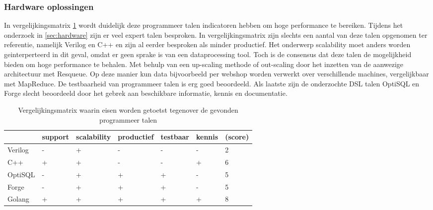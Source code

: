 \clearpage

\subsubsection{\textbf{Hardware oplossingen}}

In vergelijkingsmatrix \ref{tab:matrix_hardware} wordt duidelijk deze programmeer talen indicatoren hebben om hoge performance te bereiken. Tijdens het onderzoek in \ref{sec:hardware} zijn er veel expert talen besproken. In vergelijkingsmatrix zijn slechts een aantal van deze talen opgenomen ter referentie, namelijk Verilog en C++ en zijn al eerder besproken als minder productief. Het onderwerp scalability moet anders worden geinterperteerd in dit geval, omdat er geen sprake is van een dataprocessing tool. Toch is de consensus dat deze talen de mogelijkheid bieden om hoge performance te behalen. Met behulp van een up-scaling methode of out-scaling door het inzetten van de aanwezige architectuur met Resqueue. Op deze manier kun data bijvoorbeeld per webshop worden verwerkt over verschillende machines, vergelijkbaar met MapReduce. De testbaarheid van programmeer talen is erg goed beoordeeld. Als laatste zijn de onderzochte DSL talen OptiSQL en Forge slecht beoordeeld door het gebrek aan beschikbare informatie, kennis en documentatie.

\begin{table}[bh]
\caption{Vergelijkingsmatrix waarin eisen worden getoetst tegenover de gevonden programmeer talen}
\label{tab:matrix_hardware}
\begin{tabular}{|p{3cm}|l|l|l|l|l|l|}
\hline
           & support & scalability               & productief & testbaar & kennis &     (score)  \\ \hline
Verilog    & -       & +                         & -          & -        & -      & 2     \\ \hline
C++        & +       & +                         & -          & -        & +      & 6     \\ \hline
OptiSQL    & -       & +                         & +          & +        & -      & 5     \\ \hline
Forge      & -       & +                         & +          & +        & -      & 5     \\ \hline
Golang     & +       & +                         & +          & +        & +      & 8     \\ \hline
\end{tabular}
\end{table}

